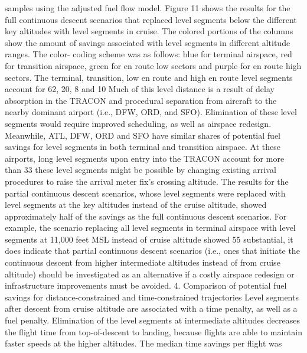 \documentclass{aer1315-pretty}
\begin{document}
\begin{itemize}
samples using the adjusted fuel flow model. Figure 11 shows the results for the full continuous descent scenarios
that replaced level segments below the different key altitudes with level segments in cruise. The colored portions of
the columns show the amount of savings associated with level segments in different altitude ranges. The color-
coding scheme was as follows: blue for terminal airspace, red for transition airspace, green for en route low sectors
and purple for en route high sectors. The terminal, transition, low en route and high en route level segments account
for 62, 20, 8 and 10%
Much of this level distance is a result of delay absorption in the TRACON and procedural separation from aircraft to
the nearby dominant airport (i.e., DFW, ORD, and SFO). Elimination of these level segments would require
improved scheduling, as well as airspace redesign. Meanwhile, ATL, DFW, ORD and SFO have similar shares of
potential fuel savings for level segments in both terminal and transition airspace. At these airports, long level
segments upon entry into the TRACON account for more than 33%
these level segments might be possible by changing existing arrival procedures to raise the arrival meter fix’s
crossing altitude.
    The results for the partial continuous descent scenarios, whose level segments were replaced with level segments
at the key altitudes instead of the cruise altitude, showed approximately half of the savings as the full continuous
descent scenarios. For example, the scenario replacing all level segments in terminal airspace with level segments at
11,000 feet MSL instead of cruise altitude showed 55%
substantial, it does indicate that partial continuous descent scenarios (i.e., ones that initiate the continuous descent
from higher intermediate altitudes instead of from cruise altitude) should be investigated as an alternative if a costly
airspace redesign or infrastructure improvements must be avoided.
    4. Comparison of potential fuel savings for distance-constrained and time-constrained trajectories
    Level segments after descent from cruise altitude are associated with a time penalty, as well as a fuel penalty.
Elimination of the level segments at intermediate altitudes decreases the flight time from top-of-descent to landing,
because flights are able to maintain faster speeds at the higher altitudes. The median time savings per flight was

\end{itemize}
\end{document}

